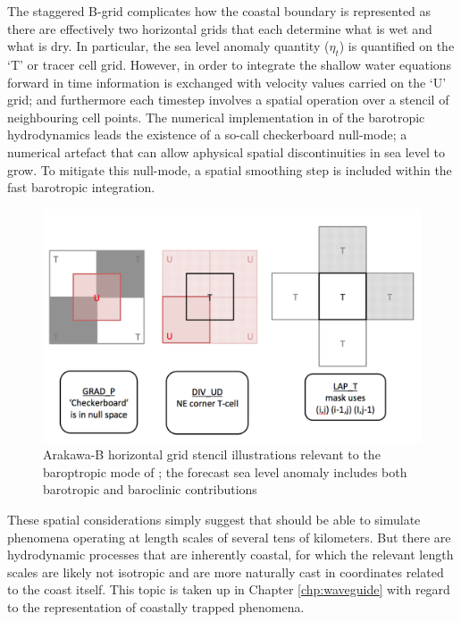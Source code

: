 The staggered B-grid complicates how the coastal boundary is represented as there are effectively two horizontal grids that each determine what is wet and what is dry.
In particular, the sea level anomaly quantity ($\eta_t$) is quantified on the `T' or tracer cell grid.    However, in order to integrate the shallow water equations forward in time information is exchanged with velocity values carried on the `U' grid; and furthermore each timestep involves a spatial operation over a stencil of neighbouring cell points. 
The numerical implementation in \BL{} of the barotropic hydrodynamics leads the existence of a so-call checkerboard null-mode; a numerical artefact that can allow aphysical spatial discontinuities in sea level to grow.   To mitigate this null-mode, a spatial smoothing step is included within the fast barotropic integration.
\begin{figure}[H]
    \begin{center}
    \includegraphics[width=\figwidthBig]{figures/diagrams/mom_BT_stencils_extra.png}
    \caption{Arakawa-B horizontal grid stencil illustrations relevant to the baroptropic mode of \BL{}; the forecast sea level anomaly includes both barotropic and baroclinic contributions}
    \end{center}
    \label{fig:atlas}
\end{figure}
These spatial considerations simply suggest that \BL{} should be able to simulate phenomena operating at length scales of several tens of kilometers.
But there are hydrodynamic processes that are inherently coastal, for which the relevant length scales are likely not isotropic and are more naturally cast in coordinates related to the coast itself.    
This topic is taken up in Chapter \ref{chp:waveguide} with regard to the representation of coastally trapped phenomena.





